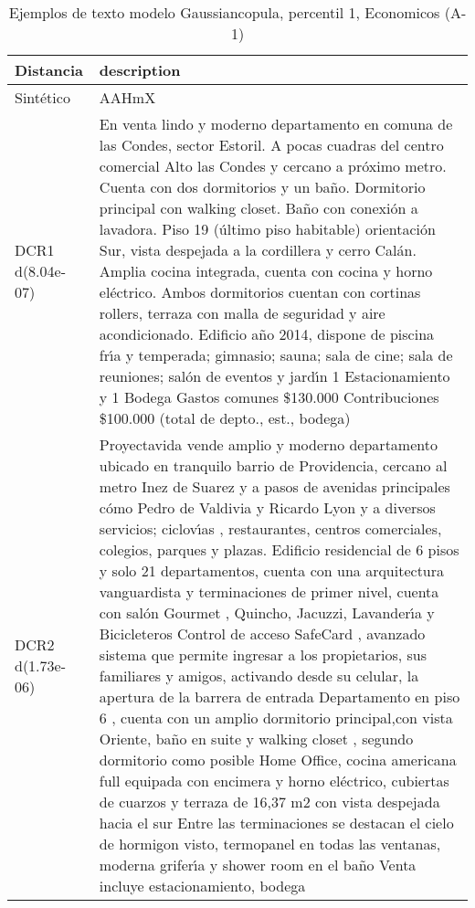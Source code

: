 \begin{table}[H]
\centering
\fontsize{10}{14}\selectfont
\caption{Ejemplos de texto modelo Gaussiancopula, percentil 1, Economicos (A-1)}
\label{table-example-economicos-a-1-gaussiancopula-1p-text}
\begin{tabular}{|l|m{35em}|}
\hline
\rowcolor[gray]{0.8}
Distancia & description \\
\hline Sintético & AAHmX \\
\hline DCR1 d(8.04e-07) & En venta lindo y moderno departamento en comuna de las Condes, sector Estoril. A pocas cuadras del centro comercial Alto las Condes y cercano a pr\'oximo metro. Cuenta con dos dormitorios y un ba\~no. Dormitorio principal con walking closet. Ba\~no con conexi\'on a lavadora. Piso 19 (\'ultimo piso habitable) orientaci\'on Sur, vista despejada a la cordillera y cerro Cal\'an. Amplia cocina integrada, cuenta con cocina y horno el\'ectrico. Ambos dormitorios cuentan con cortinas rollers, terraza con malla de seguridad y aire acondicionado. Edificio a\~no 2014, dispone de piscina fr{\'\i}a y temperada; gimnasio; sauna; sala de cine; sala de reuniones; sal\'on de eventos y jard{\'\i}n 1 Estacionamiento y 1 Bodega Gastos comunes \$130.000 Contribuciones \$100.000 (total de depto., est., bodega) \\
\hline DCR2 d(1.73e-06) & Proyectavida vende amplio y moderno departamento ubicado en tranquilo barrio de Providencia, cercano al metro Inez de Suarez y a pasos de avenidas principales c\'omo Pedro de Valdivia y Ricardo Lyon y a diversos servicios; ciclov{\'\i}as , restaurantes, centros comerciales, colegios, parques y plazas.  Edificio residencial de 6 pisos y solo 21 departamentos, cuenta con una arquitectura vanguardista y terminaciones de primer nivel, cuenta con sal\'on Gourmet , Quincho, Jacuzzi, Lavander{\'\i}a y Bicicleteros  Control de acceso SafeCard , avanzado sistema que permite ingresar a los propietarios, sus familiares y amigos, activando desde su celular, la apertura de la barrera de entrada  Departamento en piso 6 , cuenta con un amplio dormitorio principal,con vista Oriente, ba\~no en suite y walking closet , segundo dormitorio como posible Home Office, cocina americana full equipada con encimera y horno el\'ectrico, cubiertas de cuarzos y terraza de 16,37 m2 con vista despejada hacia el sur  Entre las terminaciones se destacan el cielo de hormigon visto, termopanel en todas las ventanas, moderna grifer{\'\i}a y shower room en el ba\~no  Venta incluye estacionamiento, bodega \\
\hline
\end{tabular}
\end{table}
